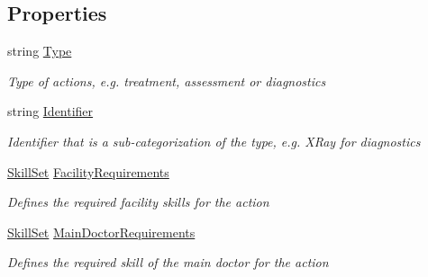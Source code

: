 \subsection*{Properties}
\begin{DoxyCompactItemize}
\item 
string \hyperlink{class_general_health_care_elements_1_1_general_classes_1_1_action_types_and_paths_1_1_action_type_class_a924754498f214c83cc3ba61c35d846f5}{Type}
\begin{DoxyCompactList}\small\item\em Type of actions, e.\+g. treatment, assessment or diagnostics \end{DoxyCompactList}\item 
string \hyperlink{class_general_health_care_elements_1_1_general_classes_1_1_action_types_and_paths_1_1_action_type_class_a50d66c20cd24c96480c4acf6ec12770b}{Identifier}
\begin{DoxyCompactList}\small\item\em Identifier that is a sub-\/categorization of the type, e.\+g. X\+Ray for diagnostics \end{DoxyCompactList}\item 
\hyperlink{class_simulation_core_1_1_h_c_c_m_elements_1_1_skill_set}{Skill\+Set} \hyperlink{class_general_health_care_elements_1_1_general_classes_1_1_action_types_and_paths_1_1_action_type_class_a8e59bd48f8529ead482692df094f191a}{Facility\+Requirements}
\begin{DoxyCompactList}\small\item\em Defines the required facility skills for the action \end{DoxyCompactList}\item 
\hyperlink{class_simulation_core_1_1_h_c_c_m_elements_1_1_skill_set}{Skill\+Set} \hyperlink{class_general_health_care_elements_1_1_general_classes_1_1_action_types_and_paths_1_1_action_type_class_a8410a4f7863e52386b733b88de87df5c}{Main\+Doctor\+Requirements}
\begin{DoxyCompactList}\small\item\em Defines the required skill of the main doctor for the action \end{DoxyCompactList}\item 

\end{DoxyCompactItemize}
